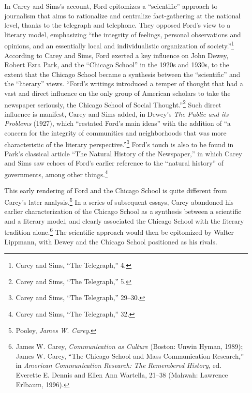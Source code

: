 \documentclass[twoside,symmetric,nobib,justified]{tufte-book}
\begin{document}
In Carey and Sims's account, Ford epitomizes a ``scientific'' approach
to journalism that aims to rationalize and centralize fact-gathering at
the national level, thanks to the telegraph and telephone. They opposed
Ford's view to a literary model, emphasizing ``the integrity of
feelings, personal observations and opinions, and an essentially local
and individualistic organization of society.''\footnote{Carey and Sims,
  ``The Telegraph,'' 4.} According to Carey and Sims, Ford exerted a key
influence on John Dewey, Robert Ezra Park, and the ``Chicago School'' in
the 1920s and 1930s, to the extent that the Chicago School became a
synthesis between the ``scientific'' and the ``literary'' views.
``Ford's writings introduced a temper of thought that had a vast and
direct influence on the only group of American scholars to take the
newspaper seriously, the Chicago School of Social Thought.''\footnote{Carey
  and Sims, ``The Telegraph,'' 5.} Such direct influence is manifest,
Carey and Sims added, in Dewey's \emph{The Public and its Problems}
(1927), which ``restated Ford's main ideas'' with the addition of ``a
concern for the integrity of communities and neighborhoods that was more
characteristic of the literary perspective.''\footnote{Carey and Sims,
  ``The Telegraph,'' 29--30.} Ford's touch is also to be found in Park's
classical article ``The Natural History of the Newspaper,'' in which
Carey and Sims saw echoes of Ford's earlier reference to the ``natural
history'' of governments, among other things.\footnote{Carey and Sims,
  ``The Telegraph,'' 32.}

This early rendering of Ford and the Chicago School is quite different
from Carey's later analysis.\footnote{Pooley, \emph{James W. Carey}.} In
a series of subsequent essays, Carey abandoned his earlier
characterization of the Chicago School as a synthesis between a
scientific and a literary model, and clearly associated the Chicago
School with the literary tradition alone.\footnote{James W. Carey,
  \emph{Communication as Culture} (Boston: Unwin Hyman, 1989); James W.
  Carey, ``The Chicago School and Mass Communication Research,'' in
  \emph{American Communication Research: The Remembered History}, ed.
  Everette E. Dennis and Ellen Ann Wartella, 21--38 (Mahwah: Lawrence
  Erlbaum, 1996).} The scientific approach would then be epitomized by
Walter Lippmann, with Dewey and the Chicago School positioned as his
rivals.
\end{document}
